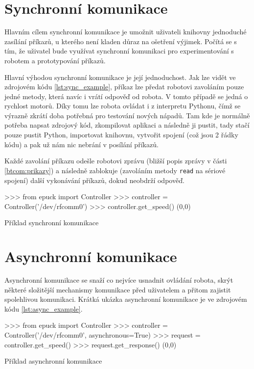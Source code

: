 \documentclass[12pt,notitlepage]{report}
\begin{document}
    \section{Synchronní komunikace}
    \label{btcom:sync}

    Hlavním cílem synchronní komunikace je umožnit uživateli knihovny
    jednoduché zasílání příkazů, u kterého není kladen důraz na ošetření
    výjimek. Počítá se s tím, že uživatel bude využívat synchronní komunikaci
    pro experimentování s robotem a prototypování příkazů.

    Hlavní výhodou synchronní komunikace je její jednoduchost. Jak lze vidět
    ve zdrojovém kódu \ref{lst:sync_example}, příkaz lze předat robotovi
    zavoláním pouze jedné metody, která navíc i vrátí odpověď od robota. V
    tomto případě se jedná o rychlost motorů. Díky tomu lze robota ovládat i z
    interpretu Pythonu, čímž se výrazně zkrátí doba potřebná pro testování
    nových nápadů. Tam kde je normálně potřeba napsat zdrojový kód, zkompilovat
    aplikaci a následně ji pustit, tady stačí pouze pustit Python, importovat
    knihovnu, vytvořit spojení (což jsou 2 řádky kódu) a pak už nám nic nebrání
    v posílání příkazů.

    Každé zavolání příkazu odešle robotovi zprávu (bližší popis zprávy v části
    \ref{btcom:prikazy}) a následně zablokuje (zavoláním metody {\tt read} na
    sériové spojení) další vykonávání příkazů, dokud neobdrží odpověď.

    \begin{listing}[h]
    \begin{pyc}
>>> from epuck import Controller
>>> controller = Controller('/dev/rfcomm0')
>>> controller.get_speed()
(0,0)
    \end{pyc}
    \caption{Příklad synchronní komunikace}
    \label{lst:sync_example}
    \end{listing}

    \section{Asynchronní komunikace}
    \label{async-impl}

    Asynchronní komunikace se snaží co nejvíce usnadnit ovládání robota, skrýt
    některé složitější mechanismy komunikace před uživatelem a přitom zajistit
    spolehlivou komunikaci. Krátká ukázka asynchronní komunikace je ve
    zdrojovém kódu \ref{lst:async_example}.

    \begin{listing}[h]
    \begin{pyc}
>>> from epuck import Controller
>>> controller = Controller('/dev/rfcomm0', asynchronous=True)
>>> request = controller.get_speed()
>>> request.get_response()
(0,0)
    \end{pyc}
    \caption{Příklad asynchronní komunikace}
    \label{lst:async_example}
    \end{listing}
\end{document}

